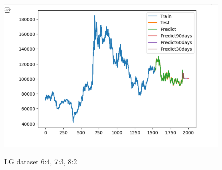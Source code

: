 \documentclass[conference]{IEEEtran}
\begin{document}
\begin{figure}[H]
\begin{minipage}{0.15\textwidth}
    \label{fig:2}
    \end{minipage}%
    \begin{minipage}{0.15\textwidth}
    \centering
    \includegraphics[width=1\textwidth]{Image/GradientBoosting/LG_8_2_GradientBoostingRegressor.png}

    \label{fig:3}
    \end{minipage}
    \caption{LG dataset 6:4, 7:3, 8:2 }
\end{figure}
\end{document}
